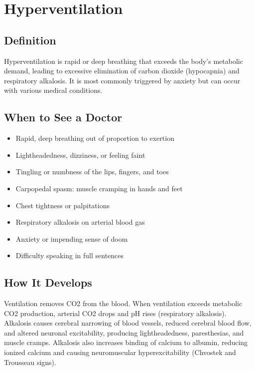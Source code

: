 \chapter{Hyperventilation}

\section*{Definition}
Hyperventilation is rapid or deep breathing that exceeds the body's metabolic demand, leading to excessive elimination of carbon dioxide (hypocapnia) and respiratory alkalosis. It is most commonly triggered by anxiety but can occur with various medical conditions.

\section*{When to See a Doctor}
\begin{itemize}
\item Rapid, deep breathing out of proportion to exertion
\item Lightheadedness, dizziness, or feeling faint
\item Tingling or numbness of the lips, fingers, and toes
\item Carpopedal spasm: muscle cramping in hands and feet
\item Chest tightness or palpitations
\item Respiratory alkalosis on arterial blood gas
\item Anxiety or impending sense of doom
\item Difficulty speaking in full sentences
\end{itemize}

\section*{How It Develops}
Ventilation removes CO2 from the blood. When ventilation exceeds metabolic CO2 production, arterial CO2 drops and pH rises (respiratory alkalosis). Alkalosis causes cerebral narrowing of blood vessels, reduced cerebral blood flow, and altered neuronal excitability, producing lightheadedness, paresthesias, and muscle cramps. Alkalosis also increases binding of calcium to albumin, reducing ionized calcium and causing neuromuscular hyperexcitability (Chvostek and Trousseau signs).

